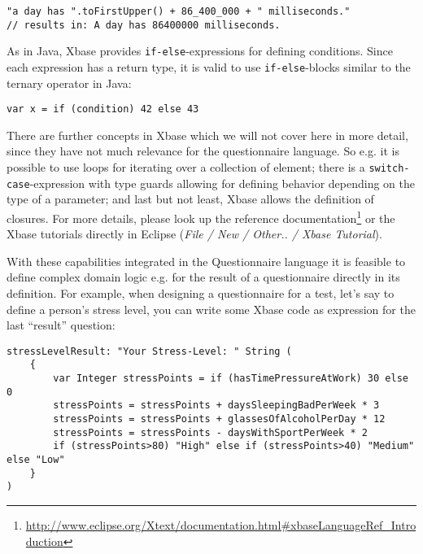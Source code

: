 \begin{lstlisting}[language=Xbase]
"a day has ".toFirstUpper() + 86_400_000 + " milliseconds."
// results in: A day has 86400000 milliseconds.
\end{lstlisting}

As in Java, Xbase provides \texttt{if-else}-expressions for defining conditions. Since each expression
has a return type, it is valid to use  \texttt{if-else}-blocks similar to the ternary operator in Java:

\begin{lstlisting}[language=Xbase]
var x = if (condition) 42 else 43
\end{lstlisting}

There are further concepts in Xbase which we will not cover here in more detail, since they have
not much relevance for the questionnaire language. So e.g. it is possible to use loops for
iterating over a collection of element; there is a \texttt{switch-case}-expression
with type guards allowing for defining behavior depending on the type of a parameter; and last but
not least, Xbase allows the definition of closures. For more details, please look up the reference
documentation\footnote{\url{http://www.eclipse.org/Xtext/documentation.html\#xbaseLanguageRef\_Introduction}}
or the Xbase tutorials directly in Eclipse (\emph{File / New / Other.. / Xbase Tutorial}). 

With these capabilities integrated in the Questionnaire language it is feasible to define complex
domain logic e.g. for the result of a questionnaire directly in its definition. For example, when
designing a questionnaire for a test, let's say to define a person's stress level, you can write
some Xbase code as expression for the last ``result'' question:

\begin{lstlisting}[language=Xbase]
stressLevelResult: "Your Stress-Level: " String (
	{
		var Integer stressPoints = if (hasTimePressureAtWork) 30 else 0
		stressPoints = stressPoints + daysSleepingBadPerWeek * 3
		stressPoints = stressPoints + glassesOfAlcoholPerDay * 12
		stressPoints = stressPoints - daysWithSportPerWeek * 2
		if (stressPoints>80) "High" else if (stressPoints>40) "Medium" else "Low"
	}
) 
\end{lstlisting}
